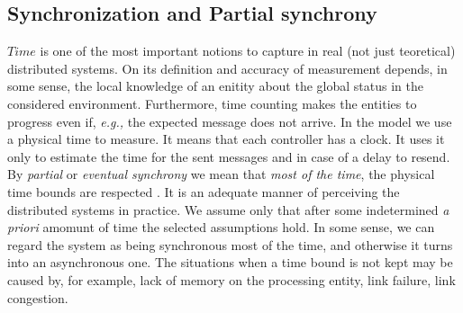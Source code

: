 \documentclass{article}
\begin{document}
\subsection{Synchronization and Partial synchrony}
$Time$ is one of the most important notions to capture in real (not just teoretical) distributed systems. On its definition and accuracy of measurement depends, in some sense, the local knowledge of an enitity about the global status in the considered environment. Furthermore, time counting makes the entities to progress even if, \emph{e.g., }the expected message does not arrive.
In the model we use a physical time to measure. It means that each controller has a clock. It uses it only to estimate the time for the sent messages and in case of a delay to resend.\\
By \emph{partial} or \emph{eventual synchrony} we mean that \emph{most of the time}, the physical time bounds are respected \cite{Guerraoui:2010:IRD:1951643}. It is an adequate manner of perceiving the distributed systems in practice. We assume only that after some indetermined \emph{a priori} amomunt of time the selected assumptions hold. In some sense, we can regard the system as being synchronous most of the time, and otherwise it turns into an  asynchronous one.
The situations when a time bound is not kept may be caused by, for example, lack of memory on the processing entity, link failure, link congestion.
\end{document}
